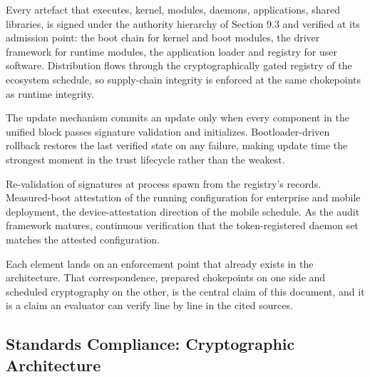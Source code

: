 \documentclass[11pt, a4paper]{article}
\begin{document}
\begin{description}[leftmargin=0pt,style=unboxed]
\item[Signed distribution.] Every artefact that executes, kernel, modules, daemons, applications, shared libraries, is signed under the authority hierarchy of Section 9.3 and verified at its admission point: the boot chain for kernel and boot modules, the driver framework for runtime modules, the application loader and registry for user software. Distribution flows through the cryptographically gated registry of the ecosystem schedule, so supply-chain integrity is enforced at the same chokepoints as runtime integrity.
\item[Verified atomic updates.] The update mechanism commits an update only when every component in the unified block passes signature validation and initializes. Bootloader-driven rollback restores the last verified state on any failure, making update time the strongest moment in the trust lifecycle rather than the weakest.
\item[Runtime integrity verification.] Re-validation of signatures at process spawn from the registry's records. Measured-boot attestation of the running configuration for enterprise and mobile deployment, the device-attestation direction of the mobile schedule. As the audit framework matures, continuous verification that the token-registered daemon set matches the attested configuration.
\end{description}

Each element lands on an enforcement point that already exists in the architecture. That correspondence, prepared chokepoints on one side and scheduled cryptography on the other, is the central claim of this document, and it is a claim an evaluator can verify line by line in the cited sources.

\subsection{Standards Compliance: Cryptographic Architecture}\label{crypto-standards-compliance}
\end{document}
